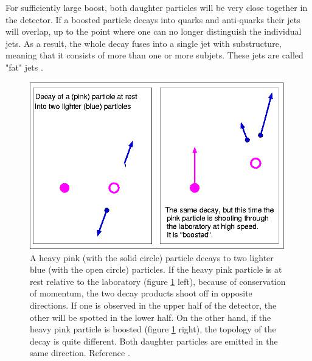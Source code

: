 

For sufficiently large boost, both daughter particles will be very close together in the detector. If a boosted particle decays into quarks and anti-quarks their jets will overlap, up to the point where one can no longer distinguish the individual jets. As a result, the whole decay fuses into a single jet with substructure, meaning that it consists of more than one or more subjets. These jets are called  "fat" jets \cite{boosted}.

\begin{figure}[H]
  \centering
  \includegraphics[width=\textwidth]{images/boost.png}
  \caption{A heavy pink (with the solid circle) particle decays to two lighter blue (with the open circle) particles. If the heavy pink particle is at rest relative to the laboratory (figure \ref{fig:boost} left), because of conservation of momentum, the two decay products shoot off in opposite directions. If one is observed in the upper half of the detector, the other will be spotted in the lower half. On the other hand, if the heavy pink particle is boosted (figure \ref{fig:boost} right), the topology of the decay is quite different. Both daughter particles are emitted in the same direction. Reference \cite{boosted}.}
  \label{fig:boost}
\end{figure}

